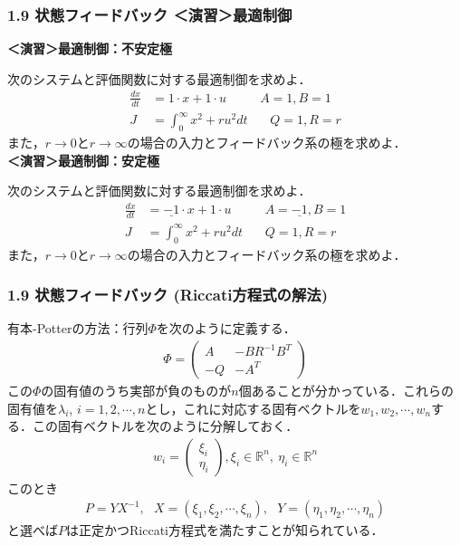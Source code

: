 \documentclass[10pt]{beamer}
\begin{document}
\begin{frame}[t]
\frametitle{1.9 状態フィードバック ＜演習＞最適制御}



\noindent
{\bf ＜演習＞最適制御：不安定極} \nopagebreak

次のシステムと評価関数に対する最適制御を求めよ．
\begin{align*}
	\frac{dx}{dt} & = 1 \cdot x + 1 \cdot u \ \ \ \ \ \ \ \ \ \ \ \ A=1,B=1\\
	J & = \int_0^{\infty} x^2 + r u^2 dt \ \ \ \ \ \ \ \ Q=1,R=r
\end{align*}
また，$r\rightarrow 0$と$r\rightarrow \infty$の場合の入力とフィードバック系の極を求めよ．
\\

\noindent
{\bf ＜演習＞最適制御：安定極} \nopagebreak

次のシステムと評価関数に対する最適制御を求めよ．
\begin{align*}
	\frac{dx}{dt} & = \underline{-1} \cdot x + 1 \cdot u \ \ \ \ \ \ \ \ \ \ \ \ A=\underline{-1},B=1\\
	J & = \int_0^{\infty} x^2 + r u^2 dt \ \ \ \ \ \ \ \ Q=1,R=r
\end{align*}
また，$r\rightarrow 0$と$r\rightarrow \infty$の場合の入力とフィードバック系の極を求めよ．

\end{frame}



\begin{frame}[t]
\frametitle{1.9 状態フィードバック (Riccati方程式の解法)}

有本-Potterの方法：行列$\Phi$を次のように定義する．
\begin{align}
 \Phi = \left(\begin{array}{cc}
	       A  & - B R^{-1} B^T \\
	       -Q & - A^T
	      \end{array}\right)
\end{align}
この$\Phi$の固有値のうち実部が負のものが$n$個あることが分かっている．これらの固有値を$\lambda_i$, $i=1,2,\cdots,n$とし，これに対応する固有ベクトルを$w_1, w_2, \cdots, w_n$する．この固有ベクトルを次のように分解しておく．
\begin{align}
 w_i = \left(\begin{array}{c}
	      \xi_i \\
	      \eta_i
	     \end{array}\right),   \xi_i \in {\mathbb R}^n, \ \eta_i \in {\mathbb R}^n
\end{align}
このとき
\begin{align}
	P = Y X^{-1}, \ \ \ 
	X = (\xi_1, \xi_2, \cdots, \xi_n), \ \ \ 
	Y = (\eta_1, \eta_2, \cdots, \eta_n)
\end{align}
と選べば$P$は正定かつRiccati方程式を満たすことが知られている．

\end{frame}
\end{document}
